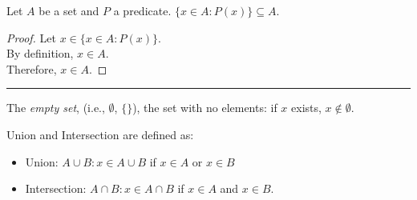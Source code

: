 \documentclass{article}
\def \proofDistance {5pt}
\def \subheaderSpace {10pt}
\newcommand{\proofseparator}{\par\noindent\rule{\textwidth}{0.4pt}}
\newcommand{\pf}[1]{
    \vspace{\proofDistance}
    \begin{proof}
    #1
    \end{proof}
    \proofseparator
}
\begin{document}
        \begin{theorem}
            Let $A$ be a set and $P$ a predicate. $\{x\in A\colon P(x)\}\subseteq A$.
        \end{theorem}

        \pf{
        Let $x\in \{x\in A\colon P(x)\}$. \\
        \indent By definition, $x\in A$. \\
        \indent Therefore, $x\in A$.
        }

        \vspace{\subheaderSpace}

        \begin{definition}
            The \textit{empty set}, (i.e., $\emptyset$, $\{\}$), the set with no elements: if $x$ exists, $x\notin \emptyset$.
        \end{definition}

        \vspace{\subheaderSpace}

\newpage


        \begin{definition}
            Union and Intersection are defined as:
            \begin{itemize}
                \item Union: $A\cup B\colon x\in A\cup B$ if $x\in A$ or $x\in B$ 
                \item Intersection: $A\cap B\colon x\in A\cap B$ if $x\in A$ and $x\in B$.
            \end{itemize}
        \end{definition}

        \vspace{\subheaderSpace}
\end{document}
